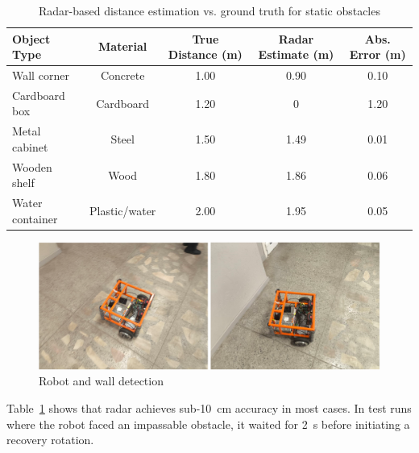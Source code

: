 \begin{table}[H]
\centering
\caption{Radar-based distance estimation vs. ground truth for static obstacles}
\begin{tabular}{@{}lcccc@{}}
\toprule
\textbf{Object Type} & \textbf{Material} & \textbf{True Distance (m)} & \textbf{Radar Estimate (m)} & \textbf{Abs. Error (m)} \\
\midrule
Wall corner         & Concrete  & 1.00 & 0.90 & 0.10 \\
Cardboard box       & Cardboard & 1.20 & 0 & 1.20 \\
Metal cabinet       & Steel     & 1.50 & 1.49 & 0.01 \\
Wooden shelf        & Wood      & 1.80 & 1.86 & 0.06 \\
Water container     & Plastic/water & 2.00 & 1.95 & 0.05 \\
\bottomrule
\end{tabular}
\label{tab:radar_accuracy}
\end{table}
\begin{figure}[H]
    \centering
    \includegraphics[width=1\linewidth]{Src//images/robotWall.png}
    \caption{Robot and  wall detection}
    \label{fig:Robotwall}
\end{figure}
\noindent
Table~\ref{tab:radar_accuracy} shows that radar achieves sub-\SI{10}{cm} accuracy in most cases.  
In test runs where the robot faced an impassable obstacle, it waited for \SI{2}{s} before initiating a recovery rotation.




